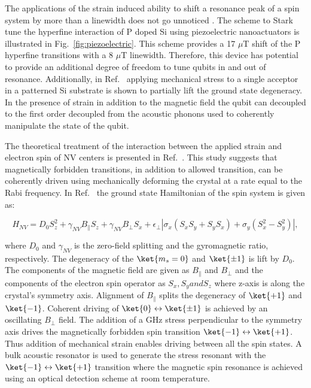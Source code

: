 The applications of the strain induced ability to shift a resonance peak of a spin system by more than a linewidth does not go unnoticed \citep{doi:10.1063/1.4919761,PhysRevApplied.9.044014,PhysRevLett.115.057601}. The scheme to Stark tune the hyperfine interaction of P doped Si using piezoelectric nanoactuators is illustrated in Fig.~\ref{fig:piezoelectric}. This scheme provides a 17 $\mu$T shift of the P hyperfine transitions with a 8 $\mu$T linewidth. Therefore, this device has potential to provide an additional degree of freedom to tune qubits in and out of resonance. Additionally, in Ref.~\citep{PhysRevB.88.064308} applying mechanical stress to a single acceptor in a patterned Si substrate is shown to partially lift the ground state degeneracy. In the presence of strain in addition to the magnetic field the qubit can decoupled to the first order decoupled from the acoustic phonons used to coherently manipulate the state of the qubit.   

The theoretical treatment of the interaction between the applied strain and electron spin of NV centers is presented in Ref.~\citep{PhysRevB.98.075201}. This study suggests that magnetically forbidden transitions, in addition to allowed transition, can be coherently driven using mechanically deforming the crystal at a rate equal to the Rabi frequency. In Ref.~\citep{} the ground state Hamiltonian of the spin system is given as:

\begin{equation}
\label{eq:HamiltonianNV}
H_{NV} = D_{0}S^{2}_{z}+\gamma_{NV}B_{\parallel}S_{z}+\gamma_{NV}B_{\perp}S_{x}+\epsilon_{\perp} \left | \sigma_{x}(S_{x}S_{y}+S_{y}S_{x})+\sigma_{y}(S^{2}_{x}-S^{2}_{y}) \right |, 
\end{equation} 

where $D_{0}$ and $\gamma_{NV}$ is the zero-field splitting and the gyromagnetic ratio, respectively. The degeneracy of the $\ket{m_{s}=0}$ and $\ket{\pm 1}$ is lift by $D_{0}$. The components of the magnetic field are given as $B_{\parallel}$ and $B_{\perp}$ and the components of the electron spin operator as $S_{x},S_{y} and S_{z}$ where z-axis is along the crystal's symmetry axis. Alignment of $B_{\parallel}$ splits the degeneracy of $\ket{+1}$ and $\ket{-1}$. Coherent driving of $\ket{0} \leftrightarrow \ket{\pm 1}$ is achieved by an oscillating $B_{\perp}$ field. The addition of a GHz stress perpendicular to the symmetry axis drives the magnetically forbidden spin transition $\ket{-1} \leftrightarrow \ket{+1}$. Thus addition of mechanical strain enables driving between all the spin states. A bulk acoustic resonator is used to generate the stress resonant with the $\ket{-1} \leftrightarrow \ket{+1}$ transition where the magnetic spin resonance is achieved using an optical detection scheme at room temperature. 

